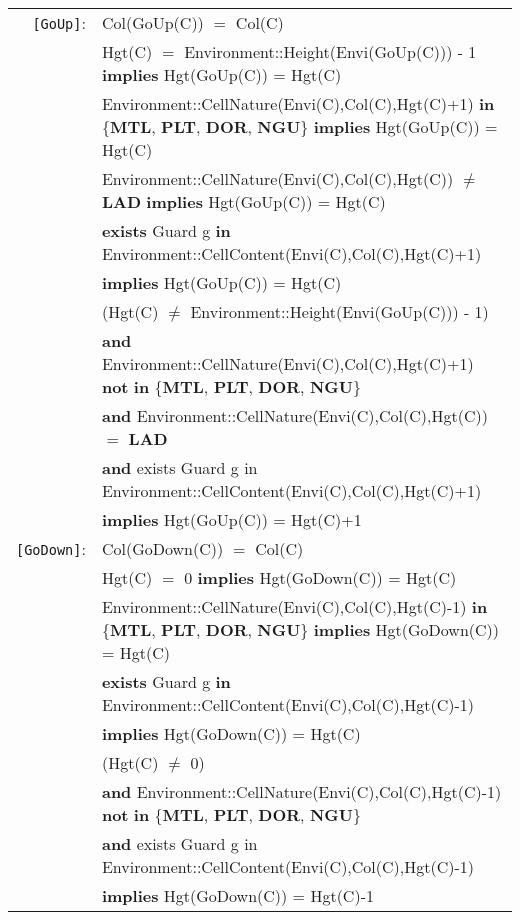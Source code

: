 \documentclass[7pt]{article}
\begin{document}
\begin{tabular}{rl}
\texttt{[GoUp]}: & \textrm{Col(GoUp(C))} $=$ \textrm{Col(C)}\\
& \textrm{Hgt(C)} $=$ Environment::Height(Envi(GoUp(C))) - 1 \textbf{implies} \textrm{Hgt(GoUp(C))} = \textrm{Hgt(C)} \\
& \textrm{Environment::CellNature(Envi(C),Col(C),Hgt(C)+1)} \textbf{in} \{\textbf{MTL}, \textbf{PLT}, \textbf{DOR}, \textbf{NGU}\} \textbf{implies} \textrm{Hgt(GoUp(C))} = \textrm{Hgt(C)} \\
& \textrm{Environment::CellNature(Envi(C),Col(C),Hgt(C))} $\neq$ \textbf{LAD} \textbf{implies} \textrm{Hgt(GoUp(C))} = \textrm{Hgt(C)} \\
& \textbf{exists} \textrm{Guard} g \textbf{in} \textrm{Environment::CellContent(Envi(C),Col(C),Hgt(C)+1)} \\ & \quad\quad \textbf{implies} \textrm{Hgt(GoUp(C))} = \textrm{Hgt(C)}  \\
& (\textrm{Hgt(C)} $\neq$ Environment::Height(Envi(GoUp(C))) - 1) \\ 
&  \quad\quad \textbf{and} \textrm{Environment::CellNature(Envi(C),Col(C),Hgt(C)+1)} \textbf{not} \textbf{in} \{\textbf{MTL}, \textbf{PLT}, \textbf{DOR}, \textbf{NGU}\} \\ 
& \quad\quad  \textbf{and} \textrm{Environment::CellNature(Envi(C),Col(C),Hgt(C))} $=$ \textbf{LAD} \\
& \quad\quad  \textbf{and} {exists} \textrm{Guard} g {in} \textrm{Environment::CellContent(Envi(C),Col(C),Hgt(C)+1)} \\ & \quad\quad \textbf{implies} \textrm{Hgt(GoUp(C))} = \textrm{Hgt(C)}+1  \\

\texttt{[GoDown]}: & \textrm{Col(GoDown(C))} $=$ \textrm{Col(C)}\\
& \textrm{Hgt(C)} $=$ 0 \textbf{implies} \textrm{Hgt(GoDown(C))} = \textrm{Hgt(C)} \\
& \textrm{Environment::CellNature(Envi(C),Col(C),Hgt(C)-1)} \textbf{in} \{\textbf{MTL}, \textbf{PLT}, \textbf{DOR}, \textbf{NGU}\} \textbf{implies} \textrm{Hgt(GoDown(C))} = \textrm{Hgt(C)} \\
& \textbf{exists} \textrm{Guard} g \textbf{in} \textrm{Environment::CellContent(Envi(C),Col(C),Hgt(C)-1)} \\ & \quad\quad \textbf{implies} \textrm{Hgt(GoDown(C))} = \textrm{Hgt(C)}  \\
& (\textrm{Hgt(C)} $\neq$ 0) \\ 
&  \quad\quad \textbf{and} \textrm{Environment::CellNature(Envi(C),Col(C),Hgt(C)-1)} \textbf{not} \textbf{in} \{\textbf{MTL}, \textbf{PLT}, \textbf{DOR}, \textbf{NGU}\} \\ 
& \quad\quad  \textbf{and} {exists} \textrm{Guard} g {in} \textrm{Environment::CellContent(Envi(C),Col(C),Hgt(C)-1)} \\ & \quad\quad \textbf{implies} \textrm{Hgt(GoDown(C))} = \textrm{Hgt(C)}-1  \\

\end{tabular}
\end{document}
